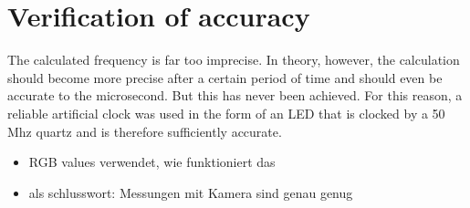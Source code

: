 \documentclass[12pt, a4paper]{report}
\begin{document}
    \pagebreak

    \section{Verification of accuracy}
    The calculated frequency is far too imprecise. In theory, however, the calculation should become more precise after a certain period of time and should even be accurate to the microsecond.
    But this has never been achieved. For this reason, a reliable artificial clock was used in the form of an LED that is clocked by a 50 Mhz quartz and is therefore sufficiently accurate.
    \begin{itemize}
    \item RGB values verwendet, wie funktioniert das
    \item als schlusswort: Messungen mit Kamera sind genau genug
    \end{itemize}
   
\end{document}

